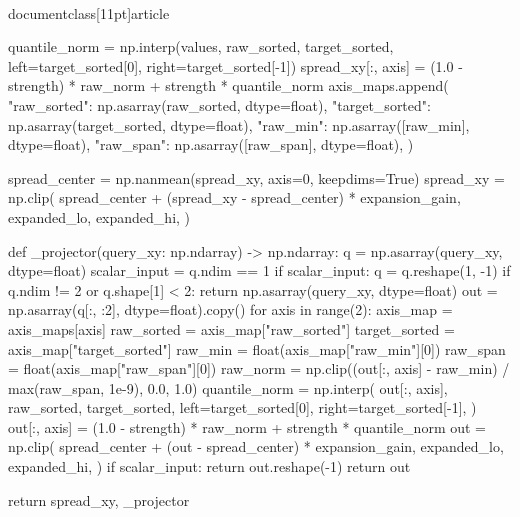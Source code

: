 \\documentclass[11pt]{article}
\begin{document}
\begin{CodeBlock}
        quantile_norm = np.interp(values, raw_sorted, target_sorted, left=target_sorted[0], right=target_sorted[-1])
        spread_xy[:, axis] = (1.0 - strength) * raw_norm + strength * quantile_norm
        axis_maps.append(
            {
                "raw_sorted": np.asarray(raw_sorted, dtype=float),
                "target_sorted": np.asarray(target_sorted, dtype=float),
                "raw_min": np.asarray([raw_min], dtype=float),
                "raw_span": np.asarray([raw_span], dtype=float),
            }
        )

    spread_center = np.nanmean(spread_xy, axis=0, keepdims=True)
    spread_xy = np.clip(
        spread_center + (spread_xy - spread_center) * expansion_gain,
        expanded_lo,
        expanded_hi,
    )

    def _projector(query_xy: np.ndarray) -> np.ndarray:
        q = np.asarray(query_xy, dtype=float)
        scalar_input = q.ndim == 1
        if scalar_input:
            q = q.reshape(1, -1)
        if q.ndim != 2 or q.shape[1] < 2:
            return np.asarray(query_xy, dtype=float)
        out = np.asarray(q[:, :2], dtype=float).copy()
        for axis in range(2):
            axis_map = axis_maps[axis]
            raw_sorted = axis_map["raw_sorted"]
            target_sorted = axis_map["target_sorted"]
            raw_min = float(axis_map["raw_min"][0])
            raw_span = float(axis_map["raw_span"][0])
            raw_norm = np.clip((out[:, axis] - raw_min) / max(raw_span, 1e-9), 0.0, 1.0)
            quantile_norm = np.interp(
                out[:, axis],
                raw_sorted,
                target_sorted,
                left=target_sorted[0],
                right=target_sorted[-1],
            )
            out[:, axis] = (1.0 - strength) * raw_norm + strength * quantile_norm
        out = np.clip(
            spread_center + (out - spread_center) * expansion_gain,
            expanded_lo,
            expanded_hi,
        )
        if scalar_input:
            return out.reshape(-1)
        return out

    return spread_xy, _projector



\end{CodeBlock}
\end{document}
